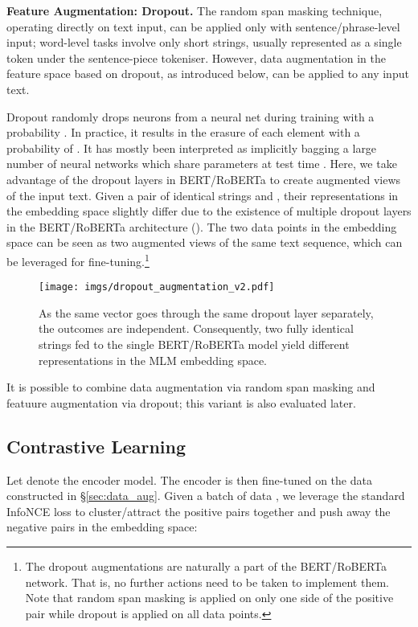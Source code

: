 \documentclass[11pt]{article}
\begin{document}
\vspace{1.5mm}
\noindent \textbf{Feature Augmentation: Dropout.} 
The random span masking technique, operating directly on text input, can be applied only with sentence/phrase-level input; word-level tasks involve only short strings, usually represented as a single token under the sentence-piece tokeniser. However, data augmentation in the feature space based on dropout, as introduced below, can be applied to any input text. 

Dropout \citep{srivastava2014dropout} randomly drops neurons from a neural net during training with a probability . In practice, it results in the erasure of each element with a probability of . It has mostly been interpreted as implicitly bagging a large number of neural networks which share parameters at test time \citep{bouthillier2015dropout}. Here, we take advantage of the dropout layers in BERT/RoBERTa to create augmented views of the input text. Given a pair of identical strings  and , their representations in the embedding space slightly differ due to the existence of multiple dropout layers in the BERT/RoBERTa architecture (). The two data points in the embedding space can be seen as two augmented views of the same text sequence, which can be leveraged for fine-tuning.\footnote{The dropout augmentations are naturally a part of the BERT/RoBERTa network. That is, no further actions need to be taken to implement them. Note that random span masking is applied on only one side of the positive pair while dropout is applied on all data points.}




\begin{figure}
    \centering
    \texttt{[image: imgs/dropout\_augmentation\_v2.pdf]}
\caption{As the same vector goes through the same dropout layer separately, the outcomes are independent. Consequently, two fully identical strings fed to the single BERT/RoBERTa model yield different representations in the MLM embedding space.}
    \label{fig:dropout_aug}
\end{figure}

It is possible to combine data augmentation via random span masking and featuure augmentation via dropout; this variant is also evaluated later. 



\subsection{Contrastive Learning}\label{sec:loss}
Let  denote the encoder model. The encoder is then fine-tuned on the data constructed in \S\ref{sec:data_aug}. Given a batch of data , we leverage the standard InfoNCE loss \citep{oord2018representation} to cluster/attract the positive pairs together and push away the negative pairs in the embedding space:
\end{document}

